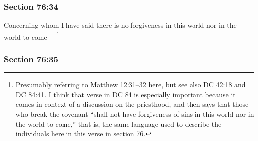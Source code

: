 
	\subsubsection{Section 76:34} %
		\label{DC76-34}

		Concerning whom I have said there is no forgiveness in this world nor in the world to come---%
			\footnote{%
				Presumably referring to \hyperref[MATTHEW-12-31]{Matthew 12:31--32} here, but see also \hyperref[DC42-18]{DC 42:18} and \hyperref[DC84-41]{DC 84:41}. I think that verse in DC 84 is especially important because it comes in context of a discussion on the priesthood, and then says that those who break the covenant ``shall not have forgiveness of sins in this world nor in the world to come,'' that is, the same language used to describe the individuals here in this verse in section 76.
				}


	\subsubsection{Section 76:35} %
		\label{DC76-35}

